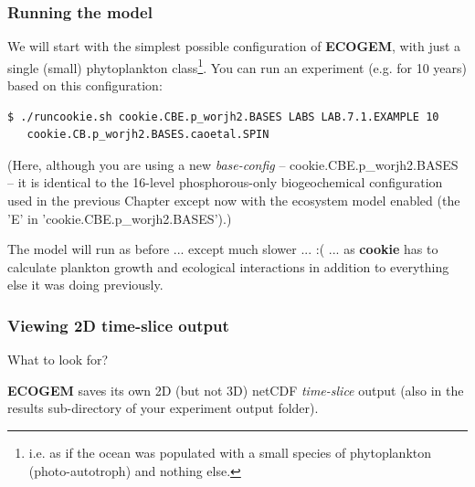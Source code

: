 \subsubsection{Running the model}
\vspace{1mm}

We will start with the simplest possible configuration of \textbf{ECOGEM}, with just a single (small) phytoplankton class\footnote{i.e. as if the ocean was populated with a small species of phytoplankton (photo-autotroph) and nothing else.}. You can run an experiment (e.g. for 10 years) based on this configuration:
\vspace{-1mm}\small\begin{verbatim}
$ ./runcookie.sh cookie.CBE.p_worjh2.BASES LABS LAB.7.1.EXAMPLE 10 
   cookie.CB.p_worjh2.BASES.caoetal.SPIN
\end{verbatim}\normalsize\vspace{-1mm}
(Here, although you are using a new \textit{base-config} -- \textsf{\footnotesize cookie.CBE.p\_worjh2.BASES} -- it is identical to the 16-level phosphorous-only biogeochemical configuration used in the previous Chapter except now with the ecosystem model enabled (the '\textsf{\footnotesize E}' in '\textsf{\footnotesize cookie.CBE.p\_worjh2.BASES}').)

The model will run as before ... except much slower ... :( ... as \textbf{cookie} has to calculate plankton growth and ecological interactions in addition to everything else it was doing previously.

\newpage
%
\subsubsection{Viewing 2D time-slice output}
\vspace{1mm}

What to look for?

\vspace{1mm}
\noindent \textbf{ECOGEM} saves its own 2D (but not 3D) netCDF \textit{time-slice} output (also in the \textsf{\footnotesize results} sub-directory of your experiment output folder).

